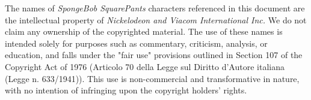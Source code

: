\renewcommand{\thesection}{\Alph{section}}
The names of \textit{SpongeBob SquarePants} characters referenced in this document are the intellectual property of \textit{Nickelodeon and Viacom International Inc.}
We do not claim any ownership of the copyrighted material. The use of these names is intended solely for purposes such as commentary, criticism, analysis, 
or education, and falls under the "fair use" provisions outlined in Section 107 of the Copyright Act of 1976 (Articolo 70 della Legge sul Diritto d'Autore 
italiana (Legge n. 633/1941)). This use is non-commercial and transformative in nature, with no intention of infringing upon the copyright holders' rights.
